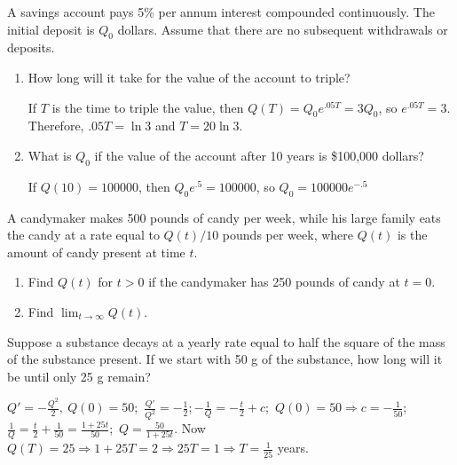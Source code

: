 \documentclass{ximera}
\begin{document}
\begin{problem}\label{exer:4.1.10}
A savings account pays 5\% per annum interest compounded
continuously. The initial deposit is $Q_0$ dollars. Assume that there
are no subsequent withdrawals or deposits.

\begin{enumerate}

\item %
How long will it take for the value of the account to triple?
\begin{solution}
If $T$ is the time to triple the value, then
$Q(T)=Q_0e^{.05T}=3Q_0$, so $e^{.05T}=3$.
Therefore, $.05T=\ln3$ and $T=20\ln3$.
\end{solution}

\item %
What is $Q_0$ if the value of the account after 10 years is \$100,000
dollars?

\begin{solution}
If $Q(10)=100000$, then  $Q_0e^{.5}=100000$,
so $Q_0=100000e^{-.5}$
\end{solution}
\end{enumerate}
\end{problem}

\begin{problem}\label{exer:4.1.11}
A candymaker makes 500 pounds of candy per week, while
his large family eats the candy at a rate equal to $Q(t)/10$
pounds per week, where $Q(t)$ is the amount of candy present
at time $t$.
\begin{enumerate}
\item %
Find $Q(t)$ for $t > 0$ if the candymaker has 250 pounds of
candy at $t=0$.
\item %
Find $\lim_{t\to\infty} Q(t)$.
\end{enumerate}
\end{problem}

\begin{problem}\label{exer:4.1.12}
Suppose a substance decays at a yearly rate equal
to half the square of the mass of the substance present.  If
we start with 50 g of the substance, how long will it be
until only 25 g remain?
\begin{solution}
$Q'=-\frac{Q^2}{2},\ Q(0)=50$;\, $\frac{Q'}{Q^2}=-\frac{1}{2}$;\,$-\frac{1}{Q}=-\frac{t}{2}+c$;\,
$Q(0)=50\Rightarrow c=-\frac{1}{50}$;\, $\frac{1}{Q}=\frac{t}{2}+\frac{1}{50}=\frac{1+25t}{50}$;\,
$Q=\frac{50}{1+25t}$. Now $Q(T)=25\Rightarrow1+25T=2\Rightarrow
25T=1\Rightarrow T=\frac{1}{25}$ years.
\end{solution}
\end{problem}
\end{document}
